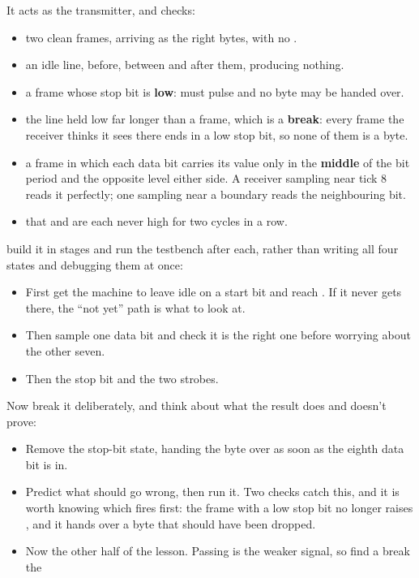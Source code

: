 \begin{parts}
    It acts as the transmitter, and checks:
    \begin{itemize}
      \item two clean frames, arriving as the right bytes, with no .
      \item an idle line, before, between and after them, producing nothing.
      \item a frame whose stop bit is \textbf{low}:  must pulse and no byte may be
        handed over.
      \item the line held low far longer than a frame, which is a \textbf{break}: every frame the
        receiver thinks it sees there ends in a low stop bit, so none of them is a byte.
      \item a frame in which each data bit carries its value only in the \textbf{middle} of the bit
        period and the opposite level either side. A receiver sampling near tick 8 reads it
        perfectly; one sampling near a boundary reads the neighbouring bit.
      \item that  and  are each never high for two cycles in a
        row.
    \end{itemize}
    \note[Tip] build it in stages and run the testbench after each, rather than writing all four
    states and debugging them at once:
    \begin{itemize}
      \item First get the machine to leave idle on a start bit and reach . If it
        never gets there, the ``not yet'' path is what to look at.
      \item Then sample one data bit and check it is the right one before worrying about the other
        seven.
      \item Then the stop bit and the two strobes.
    \end{itemize}
  \item Now break it deliberately, and think about what the result does and doesn't prove:
    \begin{itemize}
      \item Remove the stop-bit state, handing the byte over as soon as the eighth data bit is in.
      \item Predict what should go wrong, then run it. Two checks catch this, and it is worth
        knowing which fires first: the frame with a low stop bit no longer raises ,
        and it hands over a byte that should have been dropped.
      \item Now the other half of the lesson. Passing is the weaker signal, so find a break the

\end{itemize}
\end{parts}
